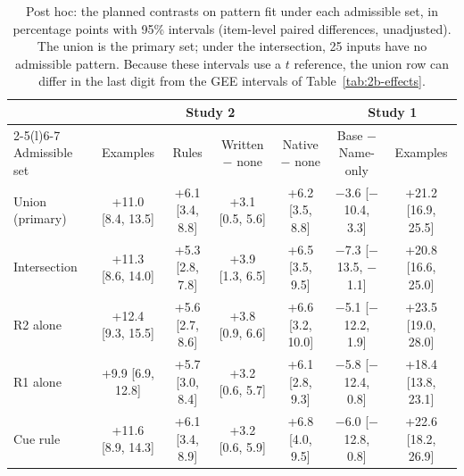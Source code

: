 \begin{table}
  \caption{Post hoc: the planned contrasts on pattern fit under each admissible set, in percentage points with 95\% intervals (item-level paired differences, unadjusted). The union is the primary set; under the intersection, 25 inputs have no admissible pattern. Because these intervals use a $t$ reference, the union row can differ in the last digit from the GEE intervals of Table~\ref{tab:2b-effects}.}
  \label{tab:labelsets}
  \footnotesize
  \setlength{\tabcolsep}{2.5pt}
  \begin{tabular}{@{}lcccccc@{}}
    \toprule
    & \multicolumn{4}{c}{Study 2} & \multicolumn{2}{c}{Study 1} \\
    \cmidrule(lr){2-5}\cmidrule(l){6-7}
    Admissible set & Examples & Rules & Written $-$ none & Native $-$ none & Base $-$ Name-only & Examples \\
    \midrule
    Union (primary) & +11.0 [8.4, 13.5] & +6.1 [3.4, 8.8] & +3.1 [0.5, 5.6] & +6.2 [3.5, 8.8] & $-$3.6 [$-$10.4, 3.3] & +21.2 [16.9, 25.5] \\
    Intersection & +11.3 [8.6, 14.0] & +5.3 [2.8, 7.8] & +3.9 [1.3, 6.5] & +6.5 [3.5, 9.5] & $-$7.3 [$-$13.5, $-$1.1] & +20.8 [16.6, 25.0] \\
    R2 alone & +12.4 [9.3, 15.5] & +5.6 [2.7, 8.6] & +3.8 [0.9, 6.6] & +6.6 [3.2, 10.0] & $-$5.1 [$-$12.2, 1.9] & +23.5 [19.0, 28.0] \\
    R1 alone & +9.9 [6.9, 12.8] & +5.7 [3.0, 8.4] & +3.2 [0.6, 5.7] & +6.1 [2.8, 9.3] & $-$5.8 [$-$12.4, 0.8] & +18.4 [13.8, 23.1] \\
    Cue rule & +11.6 [8.9, 14.3] & +6.1 [3.4, 8.9] & +3.2 [0.6, 5.9] & +6.8 [4.0, 9.5] & $-$6.0 [$-$12.8, 0.8] & +22.6 [18.2, 26.9] \\
    \bottomrule
  \end{tabular}
\end{table}
